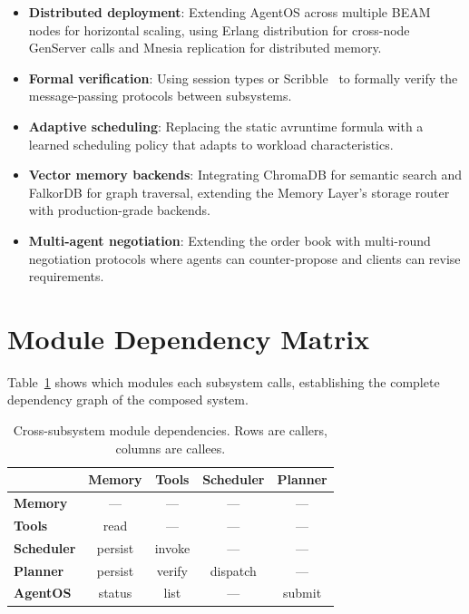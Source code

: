 \documentclass[12pt,a4paper]{article}
\theoremstyle{definition}
\begin{document}
\begin{itemize}
  \item \textbf{Distributed deployment}: Extending AgentOS across multiple
        BEAM nodes for horizontal scaling, using Erlang distribution for
        cross-node GenServer calls and Mnesia replication for distributed memory.

  \item \textbf{Formal verification}: Using session types or
        Scribble~\citep{honda2012scribble} to formally verify the message-passing
        protocols between subsystems.

  \item \textbf{Adaptive scheduling}: Replacing the static avruntime formula with
        a learned scheduling policy that adapts to workload characteristics.

  \item \textbf{Vector memory backends}: Integrating ChromaDB for semantic search
        and FalkorDB for graph traversal, extending the Memory Layer's storage
        router with production-grade backends.

  \item \textbf{Multi-agent negotiation}: Extending the order book with
        multi-round negotiation protocols where agents can counter-propose
        and clients can revise requirements.
\end{itemize}


\appendix
\section{Module Dependency Matrix}\label{app:deps}

Table~\ref{tab:deps} shows which modules each subsystem calls, establishing
the complete dependency graph of the composed system.

\begin{table}[H]
\centering
\caption{Cross-subsystem module dependencies. Rows are callers, columns are callees.}
\label{tab:deps}
\small
\begin{tabular}{l|cccc}
\toprule
 & \textbf{Memory} & \textbf{Tools} & \textbf{Scheduler} & \textbf{Planner} \\
\midrule
\textbf{Memory}    & ---     & ---     & ---       & --- \\
\textbf{Tools}     & read    & ---     & ---       & --- \\
\textbf{Scheduler} & persist & invoke  & ---       & --- \\
\textbf{Planner}   & persist & verify  & dispatch  & --- \\
\textbf{AgentOS}   & status  & list    & ---       & submit \\
\bottomrule
\end{tabular}
\end{table}
\end{document}
